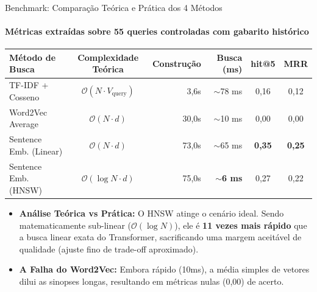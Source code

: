 \documentclass[10pt, aspectratio=169]{beamer}
\begin{document}
\begin{frame}{Benchmark: Comparação Teórica e Prática dos 4 Métodos}
    \framesubtitle{Métricas extraídas sobre 55 queries controladas com gabarito histórico}
    \begin{table}[]
        \centering
        \small
        \begin{tabular}{@{}l c r r c c@{}}
            \toprule
            \textbf{Método de Busca} & \textbf{Complexidade Teórica} & \textbf{Construção} & \textbf{Busca (ms)} & \textbf{hit@5} & \textbf{MRR} \\
            \midrule
            TF-IDF + Cosseno & $\mathcal{O}(N \cdot V_{\text{query}})$ & 3,6s & $\sim$78 ms & 0,16 & 0,12 \\
            Word2Vec Average & $\mathcal{O}(N \cdot d)$ & 30,0s & $\sim$10 ms & 0,00 & 0,00 \\
            Sentence Emb. (Linear) & $\mathcal{O}(N \cdot d)$ & 73,0s & $\sim$65 ms & \textbf{0,35} & \textbf{0,25} \\
            Sentence Emb. (HNSW) & $\mathcal{O}(\log N \cdot d)$ & 75,0s & \textbf{$\sim$6 ms} & 0,27 & 0,22 \\
            \bottomrule
        \end{tabular}
    \end{table}
    \vspace{0.1cm}
    \begin{itemize}
        \item \textbf{Análise Teórica vs Prática:} O HNSW atinge o cenário ideal. Sendo matematicamente sub-linear ($\mathcal{O}(\log N)$), ele é \textbf{11 vezes mais rápido} que a busca linear exata do Transformer, sacrificando uma margem aceitável de qualidade (ajuste fino de trade-off aproximado).
        \item \textbf{A Falha do Word2Vec:} Embora rápido (10ms), a média simples de vetores dilui as sinopses longas, resultando em métricas nulas (0,00) de acerto.
    \end{itemize}
\end{frame}
\end{document}
